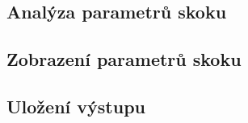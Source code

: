 \subsection{Analýza parametrů skoku}


\subsection{Zobrazení parametrů skoku}


\subsection{Uložení výstupu}


















